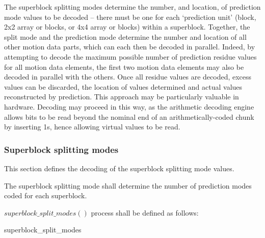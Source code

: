 \begin{informative}
The superblock splitting modes determine the number, and location, of 
prediction mode values to be decoded -- there
must be one for each `prediction unit' (block, 2x2 array or blocks, or 4x4 array or
blocks) within a superblock. Together, the split 
mode and the prediction mode determine the number and location of all other 
motion data parts, which can each then be decoded in parallel. Indeed,
by attempting to decode the maximum possible number of prediction residue 
values for all motion data elements, the first 
two motion data elements may also be decoded in parallel with the others. 
Once all residue values are decoded, excess
values can be discarded, the location of values determined and actual 
values reconstructed by prediction. This approach
may be particularly valuable in hardware. Decoding may proceed in this way, 
as the arithmetic decoding engine allows bits to be read beyond the nominal end of an
 arithmetically-coded chunk by inserting 1s, hence allowing virtual values to be read.
\end{informative}

\subsubsection{Superblock splitting modes}
\label{superblocksplit}

This section defines the decoding of the superblock splitting mode values. 

The superblock splitting mode shall determine the number of prediction modes
coded for each superblock.

$superblock\_split\_modes()$ process shall be defined as follows:

\begin{pseudo}{superblock\_split\_modes}{}
    \bsEND
\bsEND
{}
\end{pseudo}

